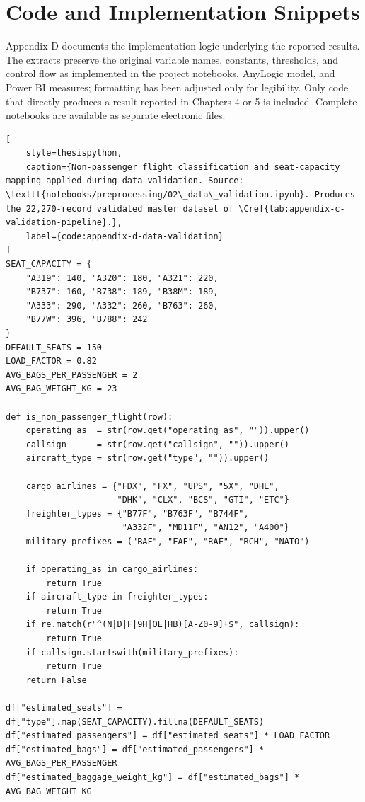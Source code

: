 \chapter{Code and Implementation Snippets}
\label{app:code-implementation-snippets}

Appendix D documents the implementation logic underlying the reported results. The extracts preserve the original variable names, constants, thresholds, and control flow as implemented in the project notebooks, AnyLogic model, and Power BI measures; formatting has been adjusted only for legibility. Only code that directly produces a result reported in Chapters 4 or 5 is included. Complete notebooks are available as separate electronic files.

\renewcommand{\lstlistingname}{Code}
\renewcommand{\thelstlisting}{\thechapter.\arabic{lstlisting}}
\setcounter{lstlisting}{0}

\captionsetup[lstlisting]{
    justification=raggedright,
    singlelinecheck=false,
    labelsep=period
}


\begin{lstlisting}[
    style=thesispython,
    caption={Non-passenger flight classification and seat-capacity mapping applied during data validation. Source: \texttt{notebooks/preprocessing/02\_data\_validation.ipynb}. Produces the 22,270-record validated master dataset of \Cref{tab:appendix-c-validation-pipeline}.},
    label={code:appendix-d-data-validation}
]
SEAT_CAPACITY = {
    "A319": 140, "A320": 180, "A321": 220,
    "B737": 160, "B738": 189, "B38M": 189,
    "A333": 290, "A332": 260, "B763": 260,
    "B77W": 396, "B788": 242
}
DEFAULT_SEATS = 150
LOAD_FACTOR = 0.82
AVG_BAGS_PER_PASSENGER = 2
AVG_BAG_WEIGHT_KG = 23

def is_non_passenger_flight(row):
    operating_as  = str(row.get("operating_as", "")).upper()
    callsign      = str(row.get("callsign", "")).upper()
    aircraft_type = str(row.get("type", "")).upper()

    cargo_airlines = {"FDX", "FX", "UPS", "5X", "DHL",
                      "DHK", "CLX", "BCS", "GTI", "ETC"}
    freighter_types = {"B77F", "B763F", "B744F",
                       "A332F", "MD11F", "AN12", "A400"}
    military_prefixes = ("BAF", "FAF", "RAF", "RCH", "NATO")

    if operating_as in cargo_airlines:
        return True
    if aircraft_type in freighter_types:
        return True
    if re.match(r"^(N|D|F|9H|OE|HB)[A-Z0-9]+$", callsign):
        return True
    if callsign.startswith(military_prefixes):
        return True
    return False

df["estimated_seats"] = df["type"].map(SEAT_CAPACITY).fillna(DEFAULT_SEATS)
df["estimated_passengers"] = df["estimated_seats"] * LOAD_FACTOR
df["estimated_bags"] = df["estimated_passengers"] * AVG_BAGS_PER_PASSENGER
df["estimated_baggage_weight_kg"] = df["estimated_bags"] * AVG_BAG_WEIGHT_KG
\end{lstlisting}

